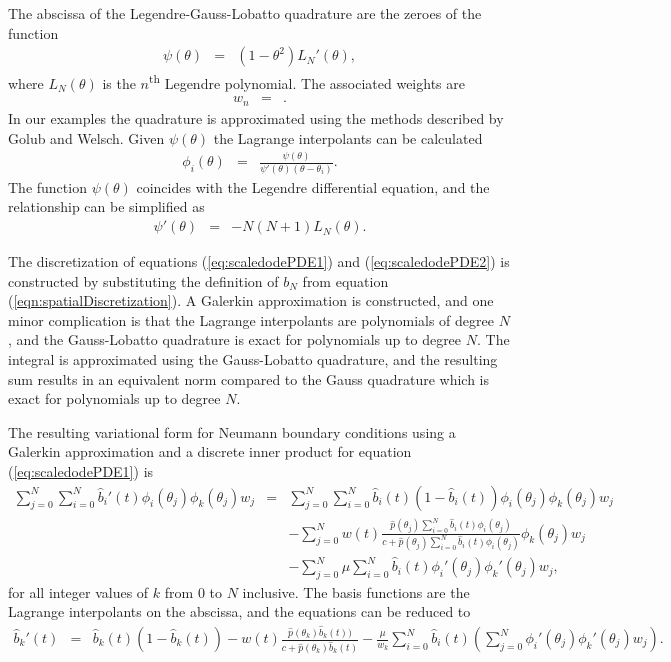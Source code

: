\documentclass[12pt]{article}
\begin{document}
The abscissa of the Legendre-Gauss-Lobatto quadrature are the zeroes
of the function
\begin{eqnarray}
  \psi(\theta) & = & \left(1-\theta^2\right) L_{N}'(\theta),
\end{eqnarray}
where $L_N(\theta)$ is the $n$\textsuperscript{th} Legendre
polynomial\cite{davis2007methods}.  The associated weights are
\begin{eqnarray}
  w_n & = & .
\end{eqnarray}
In our examples the quadrature is approximated using the methods
described by Golub and Welsch\cite{gaussQuadratureRules}.  Given
$\psi(\theta)$ the Lagrange interpolants can be calculated
\begin{eqnarray}
  \phi_i(\theta) & = & \frac{\psi(\theta)}{\psi'(\theta)(\theta-\theta_i)}.
\end{eqnarray}
The function $\psi(\theta)$ coincides with the Legendre differential
equation, and the relationship can be simplified as
\begin{eqnarray}
  \psi'(\theta) & = & -N(N+1)L_N(\theta).
\end{eqnarray}

The discretization of equations (\ref{eq:scaledodePDE1}) and
(\ref{eq:scaledodePDE2}) is constructed by substituting the definition
of $b_N$ from equation (\ref{eqn:spatialDiscretization}). A Galerkin
approximation is constructed, and one minor complication is that the
Lagrange interpolants are polynomials of degree $N$, and the
Gauss-Lobatto quadrature is exact for polynomials up to degree
$N$. The integral is approximated using the Gauss-Lobatto quadrature,
and the resulting sum results in an equivalent norm compared to the
Gauss quadrature which is exact for polynomials up to degree
$N$\cite{SobolevCanutoQuarteroni}.

The resulting variational form for Neumann boundary conditions using a
Galerkin approximation and a discrete inner product for equation
(\ref{eq:scaledodePDE1}) is
\begin{eqnarray}
  \sum_{j=0}^N \sum_{i=0}^N  \hat{b}_i'(t) \phi_i(\theta_j) \phi_k(\theta_j) w_j
  & = &
  \sum_{j=0}^N \sum_{i=0}^N  \hat{b}_i(t) (1 - \hat{b}_i(t) ) \phi_i(\theta_j) \phi_k(\theta_j) w_j \\
  & &  -  \sum_{j=0}^N w(t) \frac{\hat{p}(\theta_j) \sum_{i=0}^N \hat{b}_i(t) \phi_i(\theta_j) }{c+\hat{p}(\theta_j) \sum_{i=0}^N \hat{b}_i(t) \phi_i(\theta_j)} \phi_k(\theta_j) w_j \nonumber \\ 
  & & - \sum_{j=0}^N \mu  \sum_{i=0}^N \hat{b}_i(t) \phi_i'(\theta_j) \phi_k'(\theta_j)  w_j, \nonumber
\end{eqnarray}
for all integer values of $k$ from $0$ to $N$ inclusive.  The basis
functions are the Lagrange interpolants on the abscissa, and the
equations can be reduced to
\begin{eqnarray}
  \hat{b}_k'(t) 
  & = &
  \hat{b}_k(t) (1 - \hat{b}_k(t) ) -  w(t) \frac{\hat{p}(\theta_k) \hat{b}_k(t)) }{c+\hat{p}(\theta_k)  \hat{b}_k(t) }  
   - \frac{\mu}{w_k} \sum_{i=0}^N \hat{b}_i(t) \left( \sum_{j=0}^N  \phi_i'(\theta_j) \phi_k'(\theta_j)  w_j \right). \nonumber
\end{eqnarray}
\end{document}
